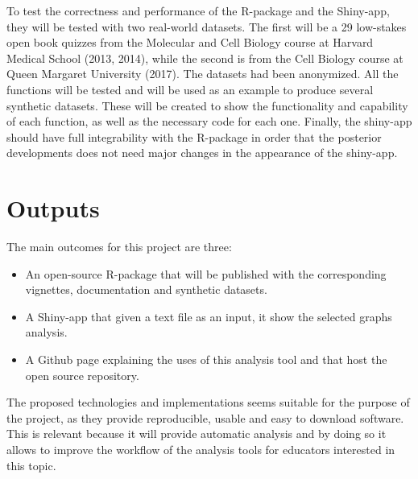\documentclass{article}
\begin{document}
To test the correctness and performance of the \textsf{R}-package and the Shiny-app, they will be tested with two real-world datasets. The first will be a 29 low-stakes open book quizzes from the Molecular and Cell Biology course at Harvard Medical School (2013, 2014), while the second is from the Cell Biology course at Queen Margaret University (2017). The datasets had been anonymized. All the functions will be tested and will be used as an example to produce several synthetic datasets. These will be created to show the functionality and capability of each function, as well as the necessary code for each one. Finally, the shiny-app should have full integrability with the \textsf{R}-package in order that the posterior developments does not need major changes in the appearance of the shiny-app.



\section*{Outputs}

The main outcomes for this project are three:

\begin{itemize}
\item An open-source \textsf{R}-package that will be published with the corresponding vignettes, documentation and synthetic datasets. 
\item A Shiny-app that given a text file as an input, it show the selected graphs analysis.
\item A Github page explaining the uses of this analysis tool and that host the open source repository. 
\end{itemize} 

The proposed technologies and implementations seems suitable for the purpose of the project, as they provide reproducible, usable and easy to download software. This is relevant because it will provide automatic analysis and by doing so it allows to improve the workflow of the analysis tools for educators interested in this topic.
\end{document}
